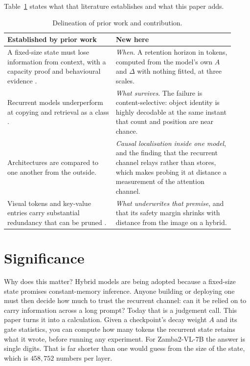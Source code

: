 \documentclass[10pt]{article}
\begin{document}
Table~\ref{tab:novelty} states what that literature establishes and what this
paper adds.

\begin{table}[h]
\centering\small
\begin{tabular}{p{0.44\linewidth}p{0.48\linewidth}}
\toprule
\textbf{Established by prior work} & \textbf{New here} \\
\midrule
A fixed-size state must lose information from context, with a capacity proof
and behavioural evidence \cite{jelassi2024copying,merrill2024illusion,wen2024rnns}.
& \emph{When}. A retention horizon in tokens, computed from the model's own
$A$ and $\Delta$ with nothing fitted, at three scales. \\
\addlinespace
Recurrent models underperform at copying and retrieval as a class
\cite{arora2023zoology,arora2024based}.
& \emph{What survives}. The failure is content-selective: object identity is
highly decodable at the same instant that count and position are near chance. \\
\addlinespace
Architectures are compared to one another from the outside.
& \emph{Causal localisation inside one model}, and the finding that the
recurrent channel relays rather than stores, which makes probing it at distance
a measurement of the attention channel. \\
\addlinespace
Visual tokens and key-value entries carry substantial redundancy that can be
pruned \cite{chen2024fastv,yang2024visionzip,shang2025prumerge}.
& \emph{What underwrites that premise}, and that its safety margin shrinks
with distance from the image on a hybrid. \\
\bottomrule
\end{tabular}
\caption{Delineation of prior work and contribution.}
\label{tab:novelty}
\end{table}

\section{Significance}

Why does this matter? Hybrid models are being adopted because a fixed-size
state promises constant-memory inference. Anyone building or deploying one
must then decide how much to trust the recurrent channel: can it be relied on
to carry information across a long prompt? Today that is a judgement call.
This paper turns it into a calculation. Given a checkpoint's decay weight $A$
and its gate statistics, you can compute how many tokens the recurrent state
retains what it wrote, before running any experiment. For Zamba2-VL-7B the
answer is single digits. That is far shorter than one would guess from the
size of the state, which is $458{,}752$ numbers per layer.
\end{document}

